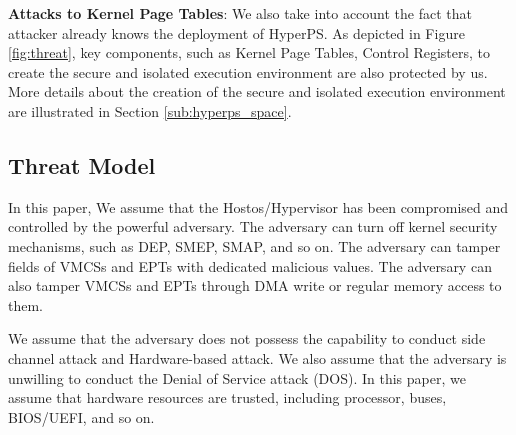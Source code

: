 \textbf{Attacks to Kernel Page Tables}: 
We also take into account the fact that attacker already knows the deployment of HyperPS. As depicted in Figure \ref{fig:threat}, key components, such as Kernel Page Tables, Control Registers, to create the secure and isolated execution environment are also protected by us. More details about the creation of the secure and isolated execution environment are illustrated in Section \ref{sub:hyperps_space}. 
 


\subsection{Threat Model} \label{sub:threatmodel}
In this paper, 
We assume that the Hostos/Hypervisor has been compromised and controlled by the powerful adversary. The adversary can turn off kernel security mechanisms, such as DEP, SMEP, SMAP, and so on. The adversary can tamper fields of VMCSs and EPTs with dedicated malicious values. The adversary can also tamper VMCSs and EPTs through DMA write or regular memory access to them.  

We assume that the adversary does not possess the capability to conduct side channel attack and Hardware-based attack. We also assume that the adversary is unwilling to conduct the Denial of Service attack (DOS). In this paper, we assume that hardware resources are trusted, including processor, buses, BIOS/UEFI, and so on. 





















